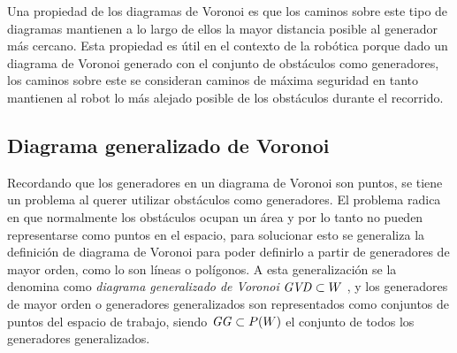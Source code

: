 Una propiedad de los diagramas de Voronoi es que los caminos sobre este tipo de diagramas mantienen a lo largo de ellos la mayor distancia posible al generador más cercano.
Esta propiedad es útil en el contexto de la robótica porque dado un diagrama de Voronoi generado con el conjunto de obstáculos como generadores, los caminos sobre este se consideran caminos de máxima seguridad en tanto mantienen al robot lo más alejado posible de los obstáculos durante el recorrido.


\subsection{Diagrama generalizado de Voronoi}\label{subsec:GVD}
Recordando que los generadores en un diagrama de Voronoi son puntos, se tiene un problema al querer utilizar obstáculos como generadores. El problema radica en que normalmente los obstáculos ocupan un área y por lo tanto no pueden representarse como puntos en el espacio, para solucionar esto se generaliza la definición de diagrama de Voronoi para poder definirlo a partir de generadores de mayor orden, como lo son líneas o polígonos. A esta generalización se la denomina como \emph{diagrama generalizado de Voronoi} $\mathit{GVD}\subset W$ , y los generadores de mayor orden o generadores generalizados son representados como conjuntos de puntos del espacio de trabajo, siendo $\mathit{GG}\subset P(W)$ el conjunto de todos los generadores generalizados.



